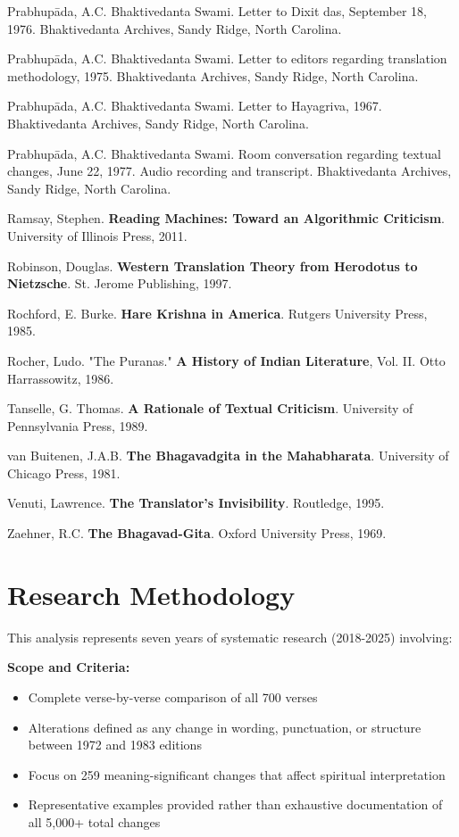\documentclass[11pt,twoside]{book}
\begin{document}
Prabhupāda, A.C. Bhaktivedanta Swami. Letter to Dixit das, September 18, 1976. Bhaktivedanta Archives, Sandy Ridge, North Carolina.

Prabhupāda, A.C. Bhaktivedanta Swami. Letter to editors regarding translation methodology, 1975. Bhaktivedanta Archives, Sandy Ridge, North Carolina.

Prabhupāda, A.C. Bhaktivedanta Swami. Letter to Hayagriva, 1967. Bhaktivedanta Archives, Sandy Ridge, North Carolina.

Prabhupāda, A.C. Bhaktivedanta Swami. Room conversation regarding textual changes, June 22, 1977. Audio recording and transcript. Bhaktivedanta Archives, Sandy Ridge, North Carolina.

Ramsay, Stephen. \textbf{Reading Machines: Toward an Algorithmic Criticism}. University of Illinois Press, 2011.

Robinson, Douglas. \textbf{Western Translation Theory from Herodotus to Nietzsche}. St. Jerome Publishing, 1997.

Rochford, E. Burke. \textbf{Hare Krishna in America}. Rutgers University Press, 1985.

Rocher, Ludo. "The Puranas." \textbf{A History of Indian Literature}, Vol. II. Otto Harrassowitz, 1986.

Tanselle, G. Thomas. \textbf{A Rationale of Textual Criticism}. University of Pennsylvania Press, 1989.

van Buitenen, J.A.B. \textbf{The Bhagavadgita in the Mahabharata}. University of Chicago Press, 1981.

Venuti, Lawrence. \textbf{The Translator's Invisibility}. Routledge, 1995.

Zaehner, R.C. \textbf{The Bhagavad-Gita}. Oxford University Press, 1969.
\section*{Research Methodology}
\label{sec:org30f0700}

This analysis represents seven years of systematic research (2018-2025) involving:

\textbf{\textbf{Scope and Criteria:}}
\begin{itemize}
\item Complete verse-by-verse comparison of all 700 verses
\item Alterations defined as any change in wording, punctuation, or structure between 1972 and 1983 editions
\item Focus on 259 meaning-significant changes that affect spiritual interpretation
\item Representative examples provided rather than exhaustive documentation of all 5,000+ total changes
\end{itemize}
\end{document}
